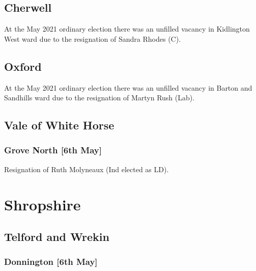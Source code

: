 \documentclass[a4paper,openany]{book}
\begin{document}
\begin{resultsiii}
\subsection*{Cherwell}

At the May 2021 ordinary election there was an unfilled vacancy in Kidlington West ward due to the resignation of Sandra Rhodes (C).

\subsection*{Oxford}


At the May 2021 ordinary election there was an unfilled vacancy in Barton and Sandhills ward due to the resignation of Martyn Rush (Lab).

\subsection*{Vale of White Horse}

\subsubsection*{Grove North \hspace*{\fill}\nolinebreak[1]%
	\enspace\hspace*{\fill}
	[6th May]}


Resignation of Ruth Molyneaux (Ind elected as LD).

\section{Shropshire}

\subsection*{Telford and Wrekin}

\subsubsection*{Donnington \hspace*{\fill}\nolinebreak[1]%
	\enspace\hspace*{\fill}
	[6th May]}


\end{resultsiii}
\end{document}
